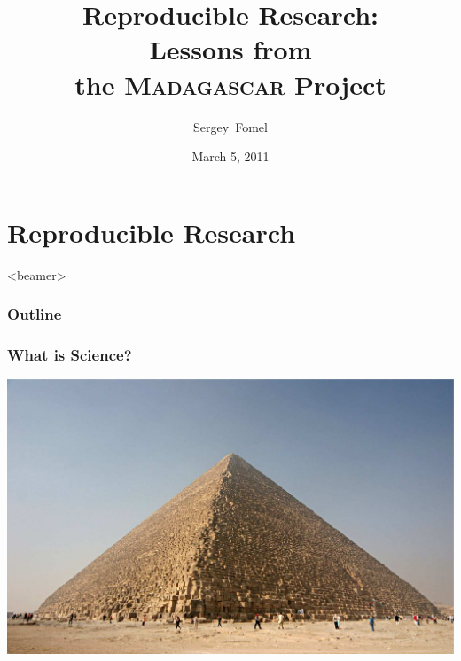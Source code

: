 \bfseries

\title[SIAM CS\&E 2011]{Reproducible Research: \\ Lessons from \\ the \textsc{Madagascar} Project}

\author[S. Fomel]{Sergey~Fomel}


\date{March 5, 2011}


\newcommand{\quotebox}[3]{
  \begin{beamercolorbox}[wd=\textwidth,center]{quotecol}
    \begin{quote}
      #1 
      \color{blue}{\emph{#2}, #3}
    \end{quote}
    \end{beamercolorbox}
}

\begin{frame}
  \MadLogo
  \titlepage
\end{frame}

\section{Reproducible Research}


\begin{frame}<beamer>
  \frametitle{Outline}
  \tableofcontents[currentsection]
\end{frame}

\begin{frame}
\frametitle{What is Science?}

\begin{center}
\includegraphics[height=0.8\textheight]{Fig/Kheops-Pyramid}
\end{center}
\end{frame}


